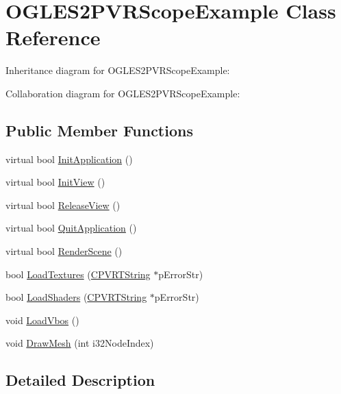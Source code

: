 \hypertarget{class_o_g_l_e_s2_p_v_r_scope_example}{\section{O\+G\+L\+E\+S2\+P\+V\+R\+Scope\+Example Class Reference}
\label{class_o_g_l_e_s2_p_v_r_scope_example}
}


Inheritance diagram for O\+G\+L\+E\+S2\+P\+V\+R\+Scope\+Example\+:


Collaboration diagram for O\+G\+L\+E\+S2\+P\+V\+R\+Scope\+Example\+:
\subsection*{Public Member Functions}
\begin{DoxyCompactItemize}
\item 
virtual bool \hyperlink{class_o_g_l_e_s2_p_v_r_scope_example_aed80aeb00f6ec3143c0739ada1d639bc}{Init\+Application} ()
\item 
virtual bool \hyperlink{class_o_g_l_e_s2_p_v_r_scope_example_aebfc54a6893ddc7b3d3705b657afd224}{Init\+View} ()
\item 
virtual bool \hyperlink{class_o_g_l_e_s2_p_v_r_scope_example_a97bd845482ac03f7f4eb1ee2c7e5c63f}{Release\+View} ()
\item 
virtual bool \hyperlink{class_o_g_l_e_s2_p_v_r_scope_example_a74a991b67e85c6009a6accd1844a4a4c}{Quit\+Application} ()
\item 
virtual bool \hyperlink{class_o_g_l_e_s2_p_v_r_scope_example_a33cdae1e8a6d2eed48fd529eb8c63ca6}{Render\+Scene} ()
\item 
bool \hyperlink{class_o_g_l_e_s2_p_v_r_scope_example_a4323897e95e7dd757304a0cdc0b3c9e2}{Load\+Textures} (\hyperlink{class_c_p_v_r_t_string}{C\+P\+V\+R\+T\+String} $\ast$p\+Error\+Str)
\item 
bool \hyperlink{class_o_g_l_e_s2_p_v_r_scope_example_a22964a3f244c3bfc1bae91fa000a717f}{Load\+Shaders} (\hyperlink{class_c_p_v_r_t_string}{C\+P\+V\+R\+T\+String} $\ast$p\+Error\+Str)
\item 
void \hyperlink{class_o_g_l_e_s2_p_v_r_scope_example_ae113b7b7de809d06b32c8fae8696404c}{Load\+Vbos} ()
\item 
void \hyperlink{class_o_g_l_e_s2_p_v_r_scope_example_a43c1ca283a095c2c946be6481c3461fc}{Draw\+Mesh} (int i32\+Node\+Index)
\end{DoxyCompactItemize}


\subsection{Detailed Description}


